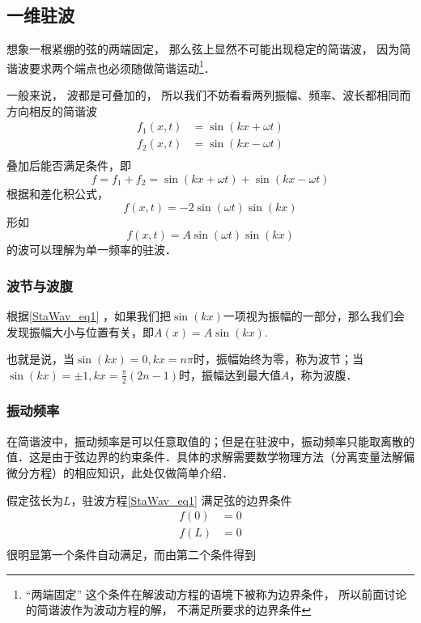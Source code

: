 
\begin{issues}
\issueDraft
\end{issues}


\subsection{一维驻波}
想象一根紧绷的弦的两端固定， 那么弦上显然不可能出现稳定的简谐波， 因为简谐波要求两个端点也必须随做简谐运动\footnote{“两端固定” 这个条件在解波动方程的语境下被称为边界条件， 所以前面讨论的简谐波作为波动方程的解， 不满足所要求的边界条件}．

一般来说， 波都是可叠加的， 所以我们不妨看看两列振幅、频率、波长都相同而方向相反的简谐波
$$
\begin{aligned}
f_1(x,t)&=\sin(kx+\omega t)\\
f_2(x,t)&=\sin(kx-\omega t)\\
\end{aligned}
$$
叠加后能否满足条件，即
$$f=f_1+f_2=\sin(kx+\omega t)+\sin(kx-\omega t)$$
根据和差化积公式，
\begin{equation}
f(x,t)=-2\sin(\omega t)\sin(kx)
\end{equation}
形如
\begin{equation}\label{StaWav_eq1}
f(x,t)=A\sin(\omega t)\sin(kx)
\end{equation}
的波可以理解为单一频率的驻波．

\subsubsection{波节与波腹}
根据\autoref{StaWav_eq1} ，如果我们把$\sin(kx)$一项视为振幅的一部分，那么我们会发现振幅大小与位置有关，即$A(x) = A \sin(kx)$.

也就是说，当$\sin(kx)=0, kx=n\pi$时，振幅始终为零，称为波节；当$\sin(kx)=\pm1, kx=\frac{\pi}{2} (2n-1)$时，振幅达到最大值$A$，称为波腹．

\subsubsection{振动频率}
在简谐波中，振动频率是可以任意取值的；但是在驻波中，振动频率只能取离散的值．这是由于弦边界的约束条件．具体的求解需要数学物理方法（分离变量法解偏微分方程）的相应知识，此处仅做简单介绍．

假定弦长为$L$，驻波方程\autoref{StaWav_eq1} 满足弦的边界条件 
$$
\begin{aligned}
f(0)&=0\\
f(L)&=0\\
\end{aligned}
$$
很明显第一个条件自动满足，而由第二个条件得到


